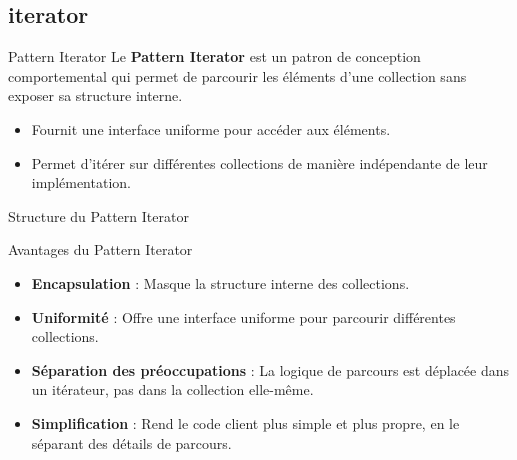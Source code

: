 \documentclass[aspectratio=169]{beamer}
\begin{document}
  \subsection{iterator}
  \begin{frame}{Pattern Iterator}
    Le \textbf{Pattern Iterator} est un patron de conception comportemental qui permet de parcourir les éléments d'une collection sans exposer sa structure interne.
    
    \begin{itemize}
        \item Fournit une interface uniforme pour accéder aux éléments.
        \item Permet d'itérer sur différentes collections de manière indépendante de leur implémentation.
    \end{itemize}
  \end{frame}

  \begin{frame}{Structure du Pattern Iterator}
  \end{frame}


  \begin{frame}{Avantages du Pattern Iterator}
    \begin{itemize}
        \item \textbf{Encapsulation} : Masque la structure interne des collections.
        \item \textbf{Uniformité} : Offre une interface uniforme pour parcourir différentes collections.
        \item \textbf{Séparation des préoccupations} : La logique de parcours est déplacée dans un itérateur, pas dans la collection elle-même.
        \item \textbf{Simplification} : Rend le code client plus simple et plus propre, en le séparant des détails de parcours.
    \end{itemize}
  \end{frame}
\end{document}
